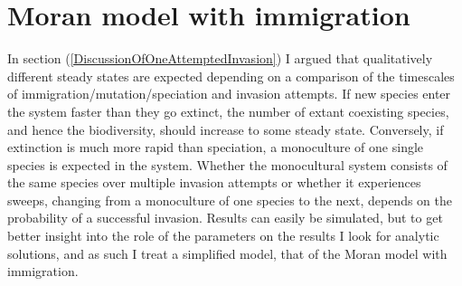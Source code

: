 \section{Moran model with immigration}
In section (\ref{DiscussionOfOneAttemptedInvasion}) I argued that qualitatively different steady states are expected depending on a comparison of the timescales of immigration/mutation/speciation and invasion attempts. 
If new species enter the system faster than they go extinct, the number of extant coexisting species, and hence the biodiversity, should increase to some steady state. 
Conversely, if extinction is much more rapid than speciation, a monoculture of one single species is expected in the system. 
Whether the monocultural system consists of the same species over multiple invasion attempts or whether it experiences sweeps, changing from a monoculture of one species to the next, depends on the probability of a successful invasion. 
Results can easily be simulated, but to get better insight into the role of the parameters on the results I look for analytic solutions, and as such I treat a simplified model, that of the Moran model with immigration. 

